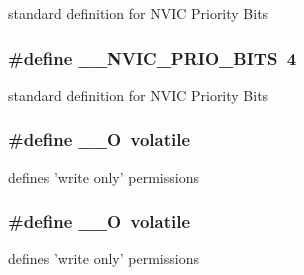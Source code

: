 standard definition for N\-V\-I\-C Priority Bits \hypertarget{group___c_m_s_i_s___c_m3__core__definitions_gae3fe3587d5100c787e02102ce3944460}{
\subsubsection[{\-\_\-\-\_\-\-N\-V\-I\-C\-\_\-\-P\-R\-I\-O\-\_\-\-B\-I\-T\-S}]{\setlength{\rightskip}{0pt plus 5cm}\#define \-\_\-\-\_\-\-N\-V\-I\-C\-\_\-\-P\-R\-I\-O\-\_\-\-B\-I\-T\-S~4}}\label{group___c_m_s_i_s___c_m3__core__definitions_gae3fe3587d5100c787e02102ce3944460}
standard definition for N\-V\-I\-C Priority Bits \hypertarget{group___c_m_s_i_s___c_m3__core__definitions_ga7e25d9380f9ef903923964322e71f2f6}{
\subsubsection[{\-\_\-\-\_\-\-O}]{\setlength{\rightskip}{0pt plus 5cm}\#define \-\_\-\-\_\-\-O~volatile}}\label{group___c_m_s_i_s___c_m3__core__definitions_ga7e25d9380f9ef903923964322e71f2f6}
defines 'write only' permissions \hypertarget{group___c_m_s_i_s___c_m3__core__definitions_ga7e25d9380f9ef903923964322e71f2f6}{
\subsubsection[{\-\_\-\-\_\-\-O}]{\setlength{\rightskip}{0pt plus 5cm}\#define \-\_\-\-\_\-\-O~volatile}}\label{group___c_m_s_i_s___c_m3__core__definitions_ga7e25d9380f9ef903923964322e71f2f6}
defines 'write only' permissions 